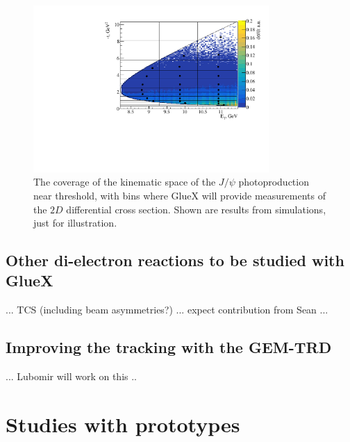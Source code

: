 \documentclass[%
preprint,
nofootinbib,
 amsmath,amssymb,
 aps,
floatfix,
]{revtex4-1}
\begin{document}
\begin{figure}[]
\includegraphics[width=0.80\textwidth]{./fig/AN4_to_theor1_TMC.pdf}
  \caption{
The coverage of the kinematic space of the 
$J/\psi $ photoproduction near threshold, with bins where GlueX
will provide measurements of the $2D$ differential cross section. 
Shown are results from simulations, just for illustration. 
}
  \label{fig:dsdt}
\end{figure}

\subsection{Other di-electron reactions to be studied with GlueX}

... TCS (including beam asymmetries?) ... expect contribution from Sean ... 

\subsection{Improving the tracking with the GEM-TRD}

... Lubomir will work on this ..

\newpage
\section{Studies with prototypes}
 
\end{document}
